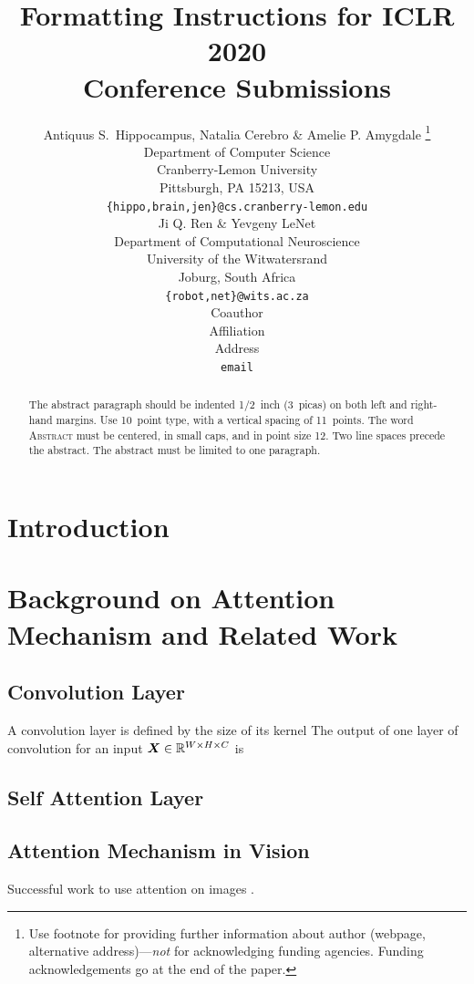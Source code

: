 \documentclass{article} %
\title{Formatting Instructions for ICLR 2020 \\ Conference Submissions}
\author{Antiquus S.~Hippocampus, Natalia Cerebro \& Amelie P. Amygdale \thanks{ Use footnote for providing further information
about author (webpage, alternative address)---\emph{not} for acknowledging
funding agencies.  Funding acknowledgements go at the end of the paper.} \\
Department of Computer Science\\
Cranberry-Lemon University\\
Pittsburgh, PA 15213, USA \\
\texttt{\{hippo,brain,jen\}@cs.cranberry-lemon.edu} \\
\And
Ji Q. Ren \& Yevgeny LeNet \\
Department of Computational Neuroscience \\
University of the Witwatersrand \\
Joburg, South Africa \\
\texttt{\{robot,net\}@wits.ac.za} \\
\AND
Coauthor \\
Affiliation \\
Address \\
\texttt{email}
}
\begin{document}
\maketitle

\begin{abstract}
The abstract paragraph should be indented 1/2~inch (3~picas) on both left and
right-hand margins. Use 10~point type, with a vertical spacing of 11~points.
The word \textsc{Abstract} must be centered, in small caps, and in point size 12. Two
line spaces precede the abstract. The abstract must be limited to one
paragraph.
\end{abstract}

\section{Introduction}

\section{Background on Attention Mechanism and Related Work}

\subsection{Convolution Layer}

A convolution layer is defined by the size of its kernel
The output of one layer of convolution for an input ${\bm{X}} \in \mathbb{R}^{W\times H \times C}$ is

\subsection{Self Attention Layer}

\subsection{Attention Mechanism in Vision}

Successful work to use attention on images \citep{ramachandran2019standaloneselfattention,belloAttentionAugmentedConvolutional2019}.
\end{document}
